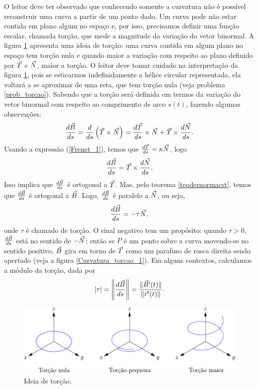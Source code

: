 O leitor deve ter observado que conhecendo somente a curvatura não é possível reconstruir uma curva a partir de um ponto dado. Um curva pode não estar contida em plano algum no espaço e, por isso, precisamos definir uma função escalar, chamada torção, que mede a magnitude da variação do vetor binormal. A figura \ref{torcao} apresenta uma ideia de torção: uma curva contida em algum plano no espaço tem torção nula e quando maior a variação com respeito ao plano definido por $\vec{T}$ e $\vec{N}$, maior a torção. O leitor deve tomar cuidado na interpretação da figura \ref{torcao}, pois se esticarmos indefinidamente a hélice circular representada, ela voltará a se aproximar de uma reta, que tem torção nula (veja problema \ref{prob_torcao}). Sabendo que a torção será definida em termos da variação do vetor binormal com respeito ao comprimento de arco $s(t)$, fazendo algumas observações:
$$
\frac{d\vec{B}}{ds}=\frac{d}{ds}\left(\vec{T}\times\vec{N}\right)=\frac{d\vec{T}}{ds}\times \vec{N}+\vec{T}\times\frac{d\vec{N}}{ds}.
$$
Usando a expressão (\ref{Frenet_1}), temos que $\frac{d\vec{T}}{ds}=\kappa\vec{N}$, logo 
$$
\frac{d\vec{B}}{ds}=\vec{T}\times\frac{d\vec{N}}{ds}.
$$
Isso implica que $\frac{d\vec{B}}{ds}$ é ortogonal a $\vec{T}$. Mas, pelo teorema \ref{teodernormacst}, temos que $\frac{d\vec{B}}{ds}$ é ortogonal a $\vec{B}$. Logo, $\frac{d\vec{B}}{ds}$ é paralelo a $\vec{N}$, ou seja,
\begin{equation}{\label{Frenet_2}}
\frac{d\vec{B}}{ds}=-\tau\vec{N},
\end{equation}
onde $\tau$ é chamado de torção. O sinal negativo tem um propósito: quando $\tau>0$, $\frac{d\vec{B}}{ds}$ está no sentido de $-\vec{N}$; então se $P$ é um ponto sobre a curva movendo-se no sentido positivo, $\vec{B}$ gira em torno de $\vec{T}$ como um parafuso de rosca direita sendo apertado (veja a figura \ref{Curvatura_torcao_1}). Em alguns contextos, calculamos a módulo da torção, dada por
$$
|\tau|=\left\|\frac{d\vec{B}}{ds}\right\|=\frac{\|\vec{B}'(t)\|}{\|\vec{r}'(t)\|}.
$$


\begin{figure}
\begin{center}
    \includegraphics{./cap_curvas/pics/exemplos_de_torcao}
 \caption{Ideia de torção.}\label{torcao}
  \end{center}
\end{figure}



